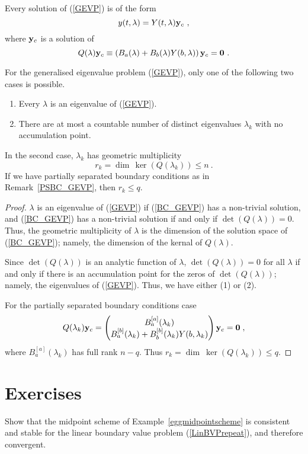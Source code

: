 Every solution of (\ref{GEVP}) is of the form
\[
y(t,\lambda) = Y(t,\lambda) \VEC{y}_c  \ ,
\]
where $\mathbf{y}_c$ is a solution of
\begin{equation} \label{BC_GEVP}
Q(\lambda) \mathbf{y}_c \equiv \left( B_a(\lambda) + B_b(\lambda)Y(b,\lambda)
\right) \mathbf{y}_c = \mathbf{0} \ .
\end{equation}

\begin{theorem}
For the generalised eigenvalue problem (\ref{GEVP}), only one of the
following two cases is possible.
\begin{enumerate}
\item Every $\lambda$ is an eigenvalue of (\ref{GEVP}).
\item There are at most a countable number of distinct eigenvalues
$\lambda_k$ with no accumulation point.
\end{enumerate}
In the second case, $\lambda_k$ has geometric multiplicity
\[
r_k = \dim\,\ker(Q(\lambda_k)) \leq n \ .
\]
If we have partially separated boundary conditions as in
Remark~\ref{PSBC_GEVP}, then $r_k \leq q$.
\end{theorem}

\begin{proof}
$\lambda$ is an eigenvalue of (\ref{GEVP}) if (\ref{BC_GEVP}) has a
non-trivial solution, and (\ref{BC_GEVP}) has a non-trivial solution
if and only if $\det(Q(\lambda))=0$.  Thus, the geometric multiplicity
of $\lambda$ is the dimension of the solution space of
(\ref{BC_GEVP}); namely, the dimension of the kernal of $Q(\lambda)$.

Since $\det(Q(\lambda))$ is an analytic function of $\lambda$,
$\det(Q(\lambda)) = 0$ for all $\lambda$ if and only if there is an
accumulation point for the zeros of $\det(Q(\lambda))$; namely, the
eigenvalues of (\ref{GEVP}).  Thus, we have either (1) or (2).

For the partially separated boundary conditions case
\[
Q(\lambda_k) \mathbf{y}_c = \begin{pmatrix}
B_a^{[a]}(\lambda_k) \\ B_a^{[b]}(\lambda_k) + B_b^{[b]}(\lambda_k)
Y(b,\lambda_k)
\end{pmatrix} \mathbf{y}_c = \mathbf{0} \; ,
\]
where $B_a^{[a]}(\lambda_k)$ has full rank $n-q$.
Thus $r_k = \dim\ \ker(Q(\lambda_k)) \leq q$.
\end{proof}

\section{Exercises}

\begin{question}
Show that the midpoint scheme of Example~\ref{eggmidpointscheme} is
consistent and stable for the linear boundary value problem
(\ref{LinBVPrepeat}), and therefore convergent.
\label{boundQ1}
\end{question}

